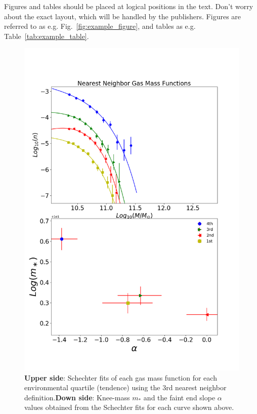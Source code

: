 \documentclass[a4paper,fleqn,usenatbib]{mnras}
\begin{document}
Figures and tables should be placed at logical positions in the text. Don't
worry about the exact layout, which will be handled by the publishers.
Figures are referred to as e.g. Fig.~\ref{fig:example_figure}, and tables as
e.g. Table~\ref{tab:example_table}.

\begin{figure}
	\includegraphics[width=\columnwidth]{./pics/F19_quartilesGas.png}
    \caption{\textbf{Upper side}: Schechter fits of each gas mass
      function for each environmental quartile (tendence) using the 3rd nearest
      neighbor definition.\textbf{Down side}: Knee-mass $m_\ast$ and
      the faint end slope $\alpha$ values obtained from the Schechter
      fits for each curve shown above.} 
    \label{fig:quartilesGas}
\end{figure}
\end{document}
